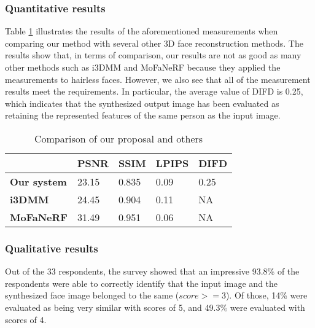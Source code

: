 \subsubsection{Quantitative results}
Table \ref{loss_stats} illustrates the results of the aforementioned measurements when comparing our method with several other 3D face reconstruction methods. The results show that, in terms of comparison, our results are not as good as many other methods such as i3DMM and MoFaNeRF because they applied the measurements to hairless faces. However, we also see that all of the measurement results meet the requirements. In particular, the average value of DIFD is 0.25, which indicates that the synthesized output image has been evaluated as retaining the represented features of the same person as the input image.

\begin{table}[H]
    \centering
    \captionsetup{font=bf}
    \caption{Comparison of our proposal and others}
    \begin{tabularx}{\linewidth}{| X | X | X | X | X |}
        \hline
                            & \textbf{PSNR} & \textbf{SSIM} & \textbf{LPIPS} & \textbf{DIFD} \\ \hline\hline
        \textbf{Our system} & 23.15         & 0.835         & 0.09           & 0.25          \\ \hline %
        \textbf{i3DMM}      & 24.45         & 0.904         & 0.11           & NA            \\ \hline
        \textbf{MoFaNeRF}   & 31.49         & 0.951         & 0.06           & NA            \\ \hline
    \end{tabularx}
    \label{loss_stats}
\end{table}

\subsubsection{Qualitative results}
Out of the 33 respondents, the survey showed that an impressive 93.8\% of the respondents were able to correctly identify that the input image and the synthesized face image belonged to the same  ($score >= 3$). Of those, 14\% were evaluated as being very similar with scores of 5, and 49.3\% were evaluated with scores of 4. %

